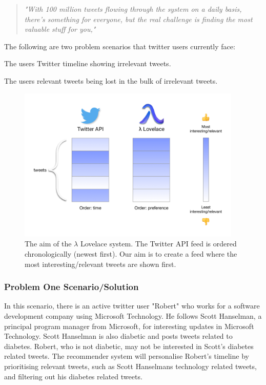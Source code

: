 \documentclass{article}
\begin{document}
\begin{quote}
    \emph{\small "With 100 million tweets flowing through the system on a daily basis, there's something for everyone, but the real challenge is finding the most valuable stuff for you,"}  
\end{quote}

\noindent The following are two problem scenarios that twitter users currently face:

\begin{itemize*}
	 \item The users Twitter timeline showing irrelevant tweets.
	 \item The users relevant tweets being lost in the bulk of irrelevant tweets.
\end{itemize*}

\begin{figure}
    \centering
    \includegraphics[width=0.95\textwidth]{explaining}
    \caption{The aim of the $\lambda$ Lovelace system. The Twitter API feed is ordered chronologically (newest first). Our aim is to create a feed where the most interesting/relevant tweets are shown first.}
\end{figure}

\subsubsection*{Problem One Scenario/Solution} 
In this scenario, there is an active twitter user "Robert" who works for a software development company using Microsoft Technology. He follows Scott Hanselman, a principal program manager from Microsoft, for interesting updates in Microsoft Technology. Scott Hanselman is also diabetic and posts tweets related to diabetes. Robert, who is not diabetic, may not be interested in Scott's diabetes related tweets. The recommender system will personalise Robert's timeline by prioritising relevant tweets, such as Scott Hanselmans technology related tweets, and filtering out his diabetes related tweets. 
\end{document}
